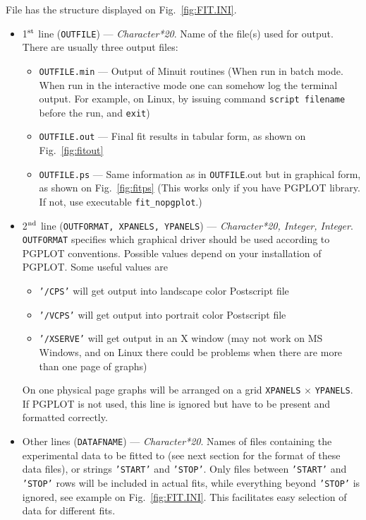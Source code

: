 \documentclass[12pt]{article}
\begin{document}
File has the structure displayed on Fig.~\ref{fig:FIT.INI}.


\begin{itemize}

\item
1$^{\rm st}$ line (\texttt{OUTFILE}) --- \emph{Character*20}. Name of the file(s) used for output.
There are usually three output files:
\begin{itemize}
\item \texttt{OUTFILE.min}  ---  Output of Minuit routines (When run in batch mode. When
run in the interactive mode one can somehow log the terminal output. For example,
on Linux, by issuing command \texttt{script filename} before the run, and
\texttt{exit})
\item \texttt{OUTFILE.out}   ---  Final fit results in tabular form, as shown on
Fig.~\ref{fig:fitout}
\item \texttt{OUTFILE.ps}    ---  Same information as in \texttt{OUTFILE}.out but 
in graphical form, as shown on
Fig.~\ref{fig:fitps}  (This works only if you have PGPLOT library. If not, use
executable \texttt{fit\_nopgplot}.)
\end{itemize}

\item 
2$^{\rm nd}$ line (\texttt{OUTFORMAT, XPANELS, YPANELS}) ---  \emph{Character*20, Integer, Integer}.
\texttt{OUTFORMAT} specifies which graphical driver should be used according to PGPLOT conventions. Possible
values depend on your installation of PGPLOT. Some useful values are
  \begin{itemize}
  \item \texttt{'/CPS'}  will get output into landscape color Postscript file 
  \item \texttt{'/VCPS'}  will get output into portrait color Postscript file 
  \item \texttt{'/XSERVE'} will get output in an X window (may not work on MS Windows, and
   on Linux there could be problems when there are more than one page of graphs)
  \end{itemize}
On one physical page graphs will be arranged on a grid \texttt{XPANELS} 
$\times$ \texttt{YPANELS}.
If PGPLOT is not used, this line is ignored but have to be present and formatted correctly.

\item
Other lines (\texttt{DATAFNAME}) --- \emph{Character*20}. Names of
files containing the experimental data to be fitted to (see next
section for the format of these data files), or strings \texttt{'START'} and \texttt{'STOP'}. 
Only files between \texttt{'START'}
and \texttt{'STOP'} rows will be included in actual fits, while everything beyond
\texttt{'STOP'} is ignored, see example on Fig.~\ref{fig:FIT.INI}.
This facilitates easy selection of data for different fits.
\end{itemize}
\end{document}

